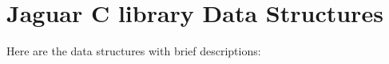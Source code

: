 \section{Jaguar C library Data Structures}
Here are the data structures with brief descriptions:\begin{CompactList}
\item{}
\item{}
\end{CompactList}
